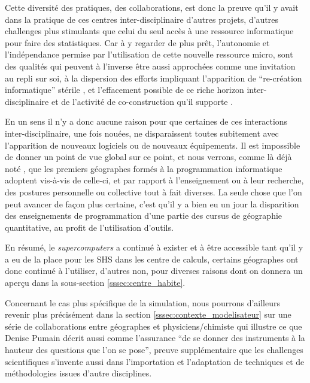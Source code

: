 Cette diversité des pratiques, des collaborations, est donc la preuve qu'il y avait dans la pratique de ces centres inter-disciplinaire d'autres projets, d'autres challenges plus stimulants que celui du seul accès à une ressource informatique pour faire des statistiques. Car à y regarder de plus prêt, l'autonomie et l'indépendance permise par l'utilisation de cette nouvelle ressource micro, sont des qualités qui peuvent à l'inverse être aussi approchées comme une invitation au repli sur soi, à la dispersion des efforts impliquant l'apparition de \enquote{re-création informatique} stérile , et l'effacement possible de ce riche horizon inter-disciplinaire et de l'activité de co-construction qu'il supporte \autocite{Banos2013}.

En un sens il n'y a donc aucune raison pour que certaines de ces interactions inter-disciplinaire, une fois nouées, ne disparaissent toutes subitement avec l'apparition de nouveaux logiciels ou de nouveaux équipements. Il est impossible de donner un point de vue global sur ce point, et nous verrons, comme là déjà noté \autocite[372]{Cuyala2014}, que les premiers géographes formés à la programmation informatique adoptent vis-à-vis de celle-ci, et par rapport à l'enseignement ou à leur recherche, des postures personnelle ou collective tout à fait diverses. La seule chose que l'on peut avancer de façon plus certaine, c'est qu'il y a bien eu un jour la disparition des enseignements de programmation d'une partie des cursus de géographie quantitative, au profit de l'utilisation d'outils.

En résumé, le \textit{supercomputers} a continué à exister et à être accessible tant qu'il y a eu de la place pour les SHS dans les centre de calculs, certains géographes ont donc continué à l'utiliser, d'autres non, pour diverses raisons dont on donnera un aperçu dans la sous-section \ref{sssec:centre_habite}.


Concernant le cas plus spécifique de la simulation, nous pourrons d'ailleurs revenir plus précisément dans la section \ref{sssec:contexte_modelisateur} sur une série de collaborations entre géographes et physiciens/chimiste qui illustre ce que Denise Pumain décrit aussi comme l'assurance \enquote{de se donner des instruments à la hauteur des questions que l'on se pose}, preuve supplémentaire que les challenges scientifiques s'invente aussi dans l'importation et l'adaptation de techniques et de méthodologies issues d'autre disciplines.

